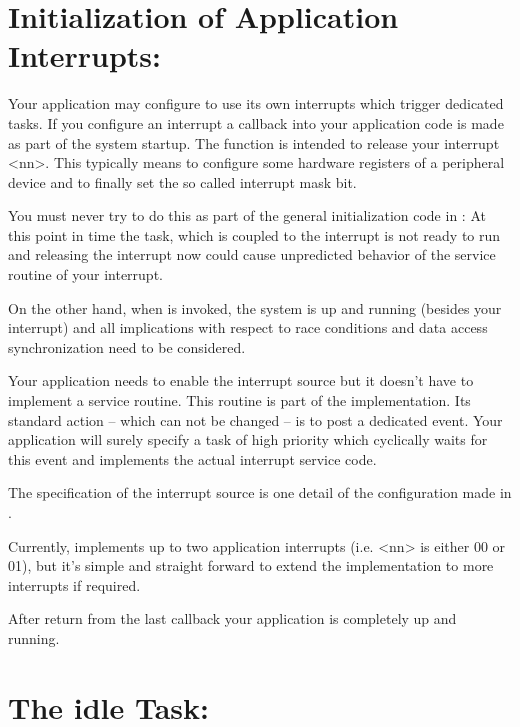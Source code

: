 \section{Initialization of Application Interrupts:
}

Your application may configure \rtos{} to use its own interrupts which
trigger dedicated tasks. If you configure an interrupt a callback into
your application code is made as part of the system startup. The function
 is intended to
release your interrupt \textless nn\textgreater. This
typically means to configure some hardware registers of a peripheral
device and to finally set the so called interrupt mask bit.

You must never try to do this as part of the general initialization code
in : At this point in time the task, which is coupled to the
interrupt is not ready to run and releasing the interrupt now could cause
unpredicted behavior of the service routine of your interrupt.

On the other hand, when  is invoked, the \rtos{} system is up and running (besides
your interrupt) and all implications with respect to race conditions and
data access synchronization need to be considered.

Your application needs to enable the interrupt source but it doesn't have
to implement a service routine. This routine is part of the \rtos{}
implementation. Its standard action -- which can not be changed -- is to
post a dedicated event. Your application will surely specify a task of
high priority which cyclically waits for this event and implements the
actual interrupt service code.

The specification of the interrupt source is one detail of the \rtos{}
configuration made in .

Currently, \rtos{} implements up to two application interrupts (i.e.
\textless nn\textgreater{} is either 00 or 01), but it's simple and
straight forward to extend the implementation to more interrupts if
required.

After return from the last callback  your application is completely up and running.


\section{The idle Task: }


